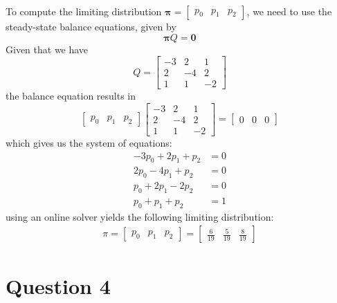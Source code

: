 \documentclass[12pt]{article}
\begin{document}
To compute the limiting distribution $\mathbf{\pi} = \begin{bmatrix}
    p_{0} & p_{1} & p_{2}
\end{bmatrix}$, we need to use the steady-state balance equations, given by \begin{equation}
    \mathbf{\pi} Q = \mathbf{0}
\end{equation} Given that we have \begin{equation}
    Q = \begin{bmatrix}
        -3 & 2 & 1 \\ 
        2 & -4 & 2 \\ 
        1 & 1 & -2
    \end{bmatrix}
\end{equation} the balance equation results in \begin{equation*}
    \begin{bmatrix}
        p_{0} & p_{1} & p_{2}
    \end{bmatrix} \begin{bmatrix}
        -3 & 2 & 1 \\ 
        2 & -4 & 2 \\ 
        1 & 1 & -2
    \end{bmatrix} = \begin{bmatrix}
        0 & 0 & 0
    \end{bmatrix}
\end{equation*} which gives us the system of equations: \begin{align*}
    -3 p_{0} + 2 p_{1} + p_{2} &= 0 \\ 
    2 p_{0} - 4 p_{1} + p_{2} &= 0 \\ 
    p_{0} + 2 p_1 - 2 p_{2} &= 0 \\ 
    p_{0} + p_{1} + p_{2} &= 1
\end{align*} using an online solver yields the following limiting distribution: \begin{align*}
    \pi = \begin{bmatrix}
        p_{0} & p_{1} & p_{2}
    \end{bmatrix} = \begin{bmatrix}
        \displaystyle \frac{6}{19} & \displaystyle \frac{5}{19} & \displaystyle \frac{8}{19}
    \end{bmatrix}
\end{align*}

\section*{Question 4}
\end{document}
